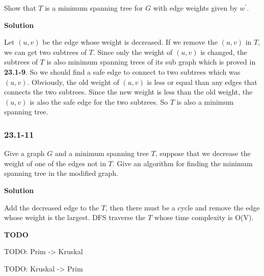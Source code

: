 Show that $T$ is a minimum spanning tree for $G$ with edge weights given by
$w^{'}$.

\textbf{Solution}

Let $(u, v)$ be the edge whose weight is decreased. If we remove the $(u, v)$ in
$T$, we can get two subtrees of $T$. Since only the weight of $(u, v)$ is
changed, the subtrees of $T$ is also minimum spanning trees of its sub graph
which is proved in \textbf{23.1-9}. So we should find a safe edge to connect
to two subtrees which was $(u, v)$. Obviously, the old weight of $(u, v)$ is
less or equal than any edges that connects the two subtrees. Since the new
weight is less than the old weight, the $(u, v)$ is also the safe edge for the
two subtrees. So $T$ is also a minimum spanning tree.


\subsubsection{23.1-11}

Give a graph $G$ and a minimum spanning tree $T$, suppose that we decrease the
weight of one of the edges not in $T$. Give an algorithm for finding the minimum
spanning tree in the modified graph.

\textbf{Solution}

Add the decreased edge to the $T$, then there must be a cycle and remove the
edge whose weight is the largest. DFS traverse the $T$ whose time complexity is
O(V).

\textbf{TODO}

TODO: Prim -> Kruskal

TODO: Kruskal -> Prim
